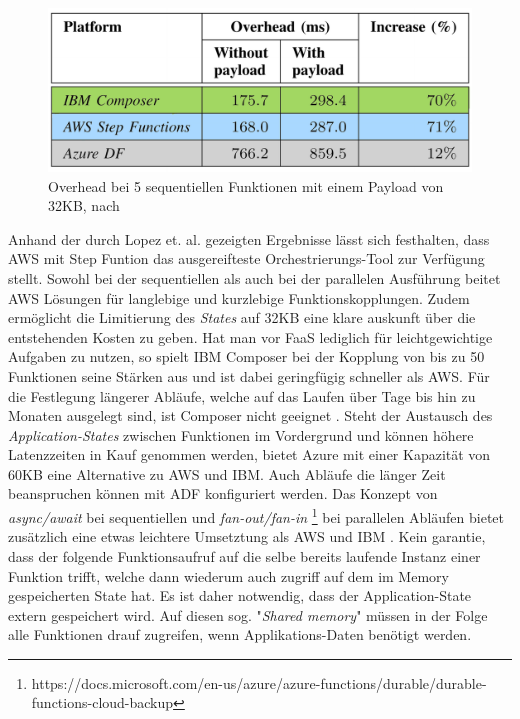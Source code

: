 \documentclass[11pt]{article}
\begin{document}
\begin{figure}[H]
\caption{Overhead bei 5 sequentiellen Funktionen mit einem Payload von 32KB, nach \cite{lopez2018comparison}}
\label{fig:orchestration}
\centering
\includegraphics[width=1\textwidth]{Orchestration}
\end{figure} 
Anhand der durch Lopez et. al. gezeigten Ergebnisse lässt sich festhalten, dass AWS mit Step Funtion das ausgereifteste Orchestrierungs-Tool zur Verfügung stellt. Sowohl bei der sequentiellen als auch bei der parallelen Ausführung beitet AWS Lösungen für langlebige und kurzlebige Funktionskopplungen. Zudem ermöglicht die Limitierung des \textit{States} auf 32KB eine klare auskunft über die entstehenden Kosten zu geben. Hat man vor FaaS lediglich für leichtgewichtige Aufgaben zu nutzen, so spielt IBM Composer bei der Kopplung von bis zu 50 Funktionen seine Stärken aus und ist dabei geringfügig schneller als AWS. Für die Festlegung längerer Abläufe, welche auf das Laufen über Tage bis hin zu Monaten ausgelegt sind, ist Composer nicht geeignet \cite{lopez2018comparison}. Steht der Austausch des \textit{Application-States} zwischen Funktionen im Vordergrund und können höhere Latenzzeiten in Kauf genommen werden, bietet Azure mit einer Kapazität von 60KB eine Alternative zu AWS und IBM. Auch Abläufe die länger Zeit beanspruchen können mit ADF konfiguriert werden. Das Konzept von \textit{async/await} bei sequentiellen und \textit{fan-out/fan-in} \footnote{https://docs.microsoft.com/en-us/azure/azure-functions/durable/durable-functions-cloud-backup} bei parallelen Abläufen bietet zusätzlich eine etwas leichtere Umsetztung als AWS und IBM \cite{lopez2018comparison}.
Kein garantie, dass der folgende Funktionsaufruf auf die selbe bereits laufende Instanz einer Funktion trifft, welche dann wiederum auch zugriff auf dem im Memory gespeicherten State hat. Es ist daher notwendig, dass der Application-State extern gespeichert wird. Auf diesen sog. "\textit{Shared memory}" müssen in der Folge alle Funktionen drauf zugreifen, wenn Applikations-Daten benötigt werden.
\end{document}
